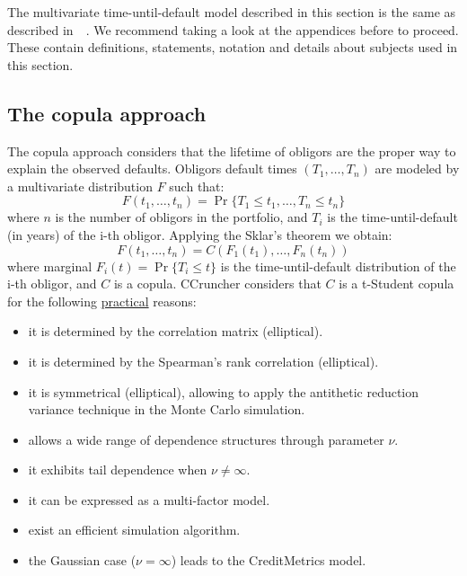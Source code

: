 \documentclass[11pt,fleqn]{book} %
\begin{document}
The multivariate time-until-default model described in this section is the 
same as described in~\cite{li:2000,roncalli:2001,frey:2001}~\cite[chap. 2.6]{bluhm:2002}.
We recommend taking a look at the appendices before to proceed. These contain 
definitions, statements, notation and details about subjects used in this 
section.

\subsection{The copula approach}
The copula approach considers that the lifetime of obligors are the 
proper way to explain the observed defaults. Obligors default times 
$(T_1,\dots,T_n)$ are modeled by a multivariate distribution $F$ such that:
\begin{displaymath}
	F(t_1, \dots, t_n) = \Pr \{T_1 \le t_1, \dots, T_n \le t_n\}
\end{displaymath}
where $n$ is the number of obligors in the portfolio, and $T_i$ is the 
time-until-default (in years) of the i-th obligor. Applying the Sklar's 
theorem we obtain:
\begin{displaymath}
	F(t_1, \dots, t_n) = 
	C\left(F_1(t_1), \dots, F_n(t_n)\right)
\end{displaymath}
where marginal $F_i(t) = \Pr\{T_i \le t\}$ is the time-until-default 
distribution of the i-th obligor, and $C$ is a copula. CCruncher considers 
that $C$ is a t-Student copula for the following \ul{practical} reasons:

\begin{itemize}
	\item it is determined by the correlation matrix (elliptical). 
	\item it is determined by the Spearman's rank correlation (elliptical). 
	\item it is symmetrical (elliptical), allowing to 
	apply the antithetic reduction variance technique in the Monte Carlo 
	simulation.
	\item allows a wide range of dependence structures through parameter $\nu$.
	\item it exhibits tail dependence when $\nu \ne \infty$.
	\item it can be expressed as a multi-factor model.
	\item exist an efficient simulation algorithm.
	\item the Gaussian case ($\nu = \infty$) leads to the 
	CreditMetrics\texttrademark{} model.
\end{itemize}
\end{document}
